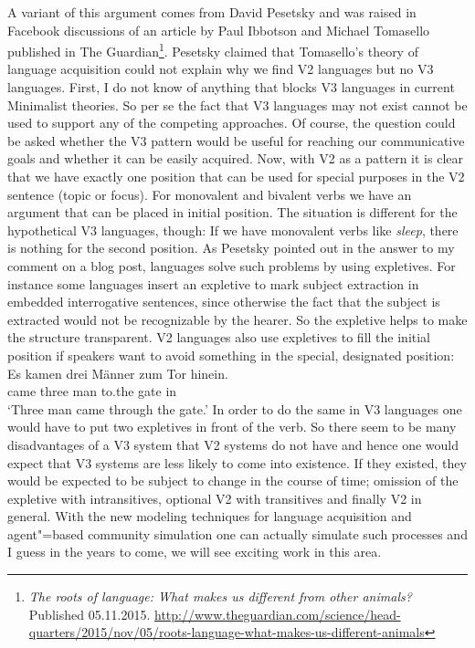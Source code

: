 A variant of this argument comes from David Pesetsky and was raised in Facebook discussions of an
article by Paul Ibbotson and Michael Tomasello
published in The Guardian\footnote{
\emph{The roots of language: What makes us different from other animals?} Published 05.11.2015. \url{http://www.theguardian.com/science/head-quarters/2015/nov/05/roots-language-what-makes-us-different-animals}
}. 
Pesetsky claimed that Tomasello's theory of language
acquisition could not explain why we find V2 languages but no V3 languages. First, I do not know of
anything that blocks V3 languages in current Minimalist theories. So per se the fact that V3
languages may not exist cannot be used to support any of the competing approaches. Of course, the
question could be asked whether the V3 pattern would be useful for reaching our communicative goals
and whether it can be easily acquired. Now, with V2 as a pattern it is clear that we have exactly
one position that can be used for special purposes in the V2 sentence (topic or focus). For monovalent and bivalent verbs we
have an argument that can be placed in initial position. The situation is different for the
hypothetical V3 languages, though: If we have monovalent verbs like \emph{sleep}, there is nothing
for the second position. As Pesetsky pointed out in the answer to my comment on a blog post, languages solve such
problems by using expletives. For instance some languages insert an expletive to mark subject
extraction in embedded interrogative sentences, since otherwise the fact that the subject is
extracted would not be recognizable by the hearer. So the expletive helps to make the structure
transparent. V2 languages also use expletives to fill the initial position if speakers want to avoid
something in the special, designated position:
\ea
\gll Es kamen drei Männer zum Tor hinein.\\
     \expl{} came three man to.the gate in\\
\glt `Three man came through the gate.'
\z
In order to do the same in V3 languages one would have to put two expletives in front of the
verb. So there seem to be many disadvantages of a V3 system that V2 systems do not have and hence
one would expect that V3 systems are less likely to come into existence. If they existed, they would
be expected to be subject to change in the course of time; \eg omission of the expletive with
intransitives, optional V2 with transitives and finally V2 in general. With the new modeling
techniques for language acquisition and agent"=based community simulation one can actually simulate
such processes and I guess in the years to come, we will see exciting work in this area. 

